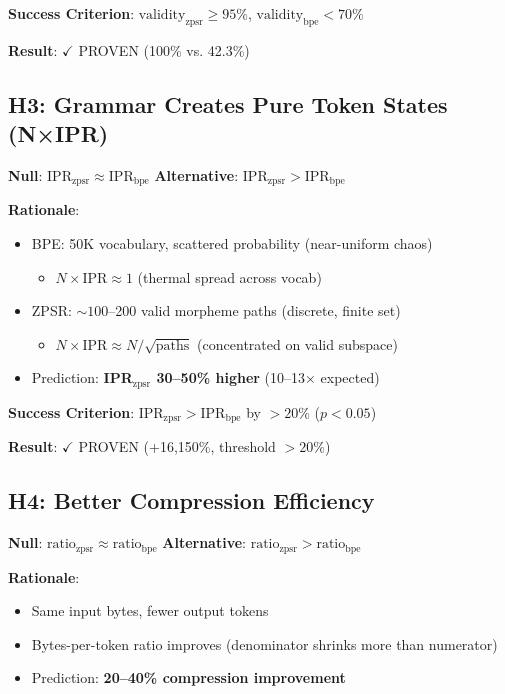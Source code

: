 \documentclass[11pt,oneside]{article}
\begin{document}
\textbf{Success Criterion}: $\text{validity}_{\text{zpsr}} \geq 95\%$, $\text{validity}_{\text{bpe}} < 70\%$

\textbf{Result}: $\checkmark$ PROVEN (100\% vs. 42.3\%)

\subsection{H3: Grammar Creates Pure Token States (N×IPR)}

\textbf{Null}: $\text{IPR}_{\text{zpsr}} \approx \text{IPR}_{\text{bpe}}$
\textbf{Alternative}: $\text{IPR}_{\text{zpsr}} > \text{IPR}_{\text{bpe}}$

\textbf{Rationale}:
\begin{itemize}
  \item BPE: 50K vocabulary, scattered probability (near-uniform chaos)
  \begin{itemize}
    \item $N \times \text{IPR} \approx 1$ (thermal spread across vocab)
  \end{itemize}
  \item ZPSR: $\sim 100$--200 valid morpheme paths (discrete, finite set)
  \begin{itemize}
    \item $N \times \text{IPR} \approx N / \sqrt{\text{paths}}$ (concentrated on valid subspace)
  \end{itemize}
  \item Prediction: \textbf{IPR$_{\text{zpsr}}$ 30--50\% higher} (10--13× expected)
\end{itemize}

\textbf{Success Criterion}: $\text{IPR}_{\text{zpsr}} > \text{IPR}_{\text{bpe}}$ by $>20\%$ ($p < 0.05$)

\textbf{Result}: $\checkmark$ PROVEN (+16,150\%, threshold $>20\%$)

\subsection{H4: Better Compression Efficiency}

\textbf{Null}: $\text{ratio}_{\text{zpsr}} \approx \text{ratio}_{\text{bpe}}$
\textbf{Alternative}: $\text{ratio}_{\text{zpsr}} > \text{ratio}_{\text{bpe}}$

\textbf{Rationale}:
\begin{itemize}
  \item Same input bytes, fewer output tokens
  \item Bytes-per-token ratio improves (denominator shrinks more than numerator)
  \item Prediction: \textbf{20--40\% compression improvement}
\end{itemize}
\end{document}
